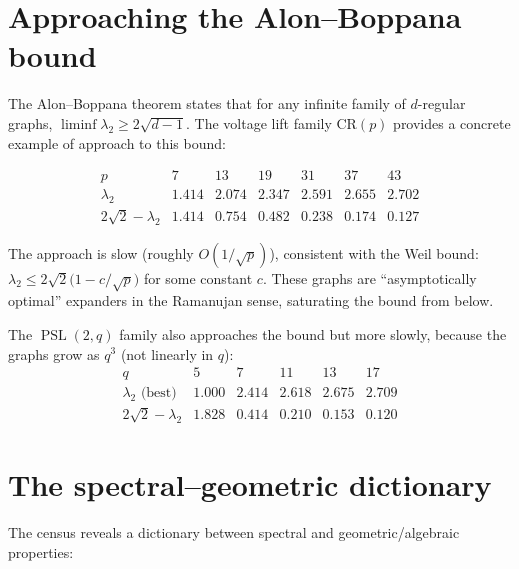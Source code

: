 \documentclass[11pt,a4paper]{article}
\theoremstyle{plain}
\theoremstyle{definition}
\theoremstyle{remark}
\newcommand{\PSL}{\operatorname{PSL}}
\begin{document}
\section{Approaching the Alon--Boppana bound}

The Alon--Boppana theorem states that for any infinite family of
$d$-regular graphs, $\liminf \lambda_2 \ge 2\sqrt{d-1}$.
The voltage lift family $\mathrm{CR}(p)$ provides a concrete example of
approach to this bound:

\[
\begin{array}{c|cccccc}
p & 7 & 13 & 19 & 31 & 37 & 43 \\
\hline
\lambda_2 & 1.414 & 2.074 & 2.347 & 2.591 & 2.655 & 2.702 \\
2\sqrt{2} - \lambda_2 & 1.414 & 0.754 & 0.482 & 0.238 & 0.174 & 0.127
\end{array}
\]

The approach is slow (roughly $O(1/\sqrt{p})$), consistent with the Weil
bound: $\lambda_2 \le 2\sqrt{2}\bigl(1 - c/\sqrt{p}\bigr)$ for some
constant $c$. These graphs are ``asymptotically optimal'' expanders in the
Ramanujan sense, saturating the bound from below.

The $\PSL(2,q)$ family also approaches the bound but more slowly,
because the graphs grow as $q^3$ (not linearly in $q$):
\[
\begin{array}{c|ccccc}
q & 5 & 7 & 11 & 13 & 17 \\
\hline
\lambda_2\text{ (best)} & 1.000 & 2.414 & 2.618 & 2.675 & 2.709 \\
2\sqrt{2} - \lambda_2 & 1.828 & 0.414 & 0.210 & 0.153 & 0.120
\end{array}
\]


\section{The spectral--geometric dictionary}

The census reveals a dictionary between spectral and geometric/algebraic
properties:
\end{document}
